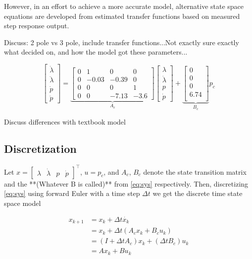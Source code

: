However, in an effort to achieve a more accurate model, alternative state space equations are developed from estimated transfer functions based on measured step response output.

Discuss: 2 pole vs 3 pole, include transfer functions...Not exactly sure exactly what decided on, and how the model got these parameters...

\begin{equation}
	\begin{bmatrix}
		\dot{\lambda}\\
		\ddot{\lambda}\\
		\dot{p}\\
		\ddot{p}
	\end{bmatrix} = 
	\underbrace{
	\begin{bmatrix}
		0 & 1 & 0 & 0 \\
		0 & -0.03 & -0.39 & 0 \\
		0 & 0 & 0 & 1 \\
		0 & 0 & -7.13 & -3.6
	\end{bmatrix}}_{A_c}
	\begin{bmatrix}
		\lambda	\\
		\dot{\lambda}		\\
		p		\\
		\dot{p}
	\end{bmatrix} +
	\underbrace{
	\begin{bmatrix}
		0 \\
		0 \\
		0 \\
		6.74 \\
	\end{bmatrix}}_{B_c}
	p_c
	\label{eq:sys}
\end{equation}

Discuss differences with textbook model

\subsection{Discretization}
Let $x = \begin{bmatrix}\lambda&\dot{\lambda}&p&\dot{p}\end{bmatrix}^\top$, $u = p_c$, and $A_c$, $B_c$ denote the state transition matrix and the **(Whatever B is called)** from \eqref{eq:sys} respectively. Then, discretizing \eqref{eq:sys} using forward Euler with a time step $\Delta t$ we get the discrete time state space model

\begin{subequations}
\label{eq:dmodel}
\begin{align}
	x_{k+1} &= x_k + \Delta t \dot{x_k} \\
			&= x_k + \Delta t (A_c x_k + B_c u_k)\\
			&= (I + \Delta t A_c) x_k + (\Delta t B_c) u_k \\
			&= A x_k + B u_k
\end{align}
\end{subequations}

